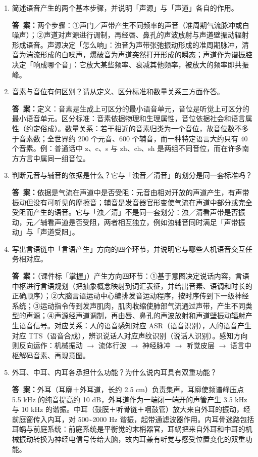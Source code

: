 \documentclass[10.5pt]{ctexart}
\newenvironment{qlist}
  {\begin{enumerate}[label={\sffamily\bfseries\color{accent}\arabic*.},leftmargin=2.4em,labelsep=0.55em,itemsep=0.62em,topsep=0.15em,parsep=0.3em,partopsep=0pt]}
  {\end{enumerate}}
\newcommand{\anslabel}{{\sffamily\bfseries\color{accent}答\ 案：}\hspace{0.35em}}
\newcommand{\ansL}[1]{\par\vspace{3.6\baselineskip}\begin{ansbox}\anslabel #1\end{ansbox}}
\begin{document}
\begin{qlist}

\item 简述语音产生的两个基本步骤，并说明「声源」与「声道」各自的作用。
\ansL{两个步骤：①声门／声带产生不同频率的声音（准周期气流脉冲或白噪声）；②声道对声源进行调制，再经唇、鼻孔的声波放射与声道壁振动辐射形成语音。声源决定「怎么响」：浊音为声带张弛振动形成的准周期脉冲，清音为湍流形成的白噪声，爆破音为声道突然打开形成的瞬态；声道作为谐振腔决定「响成哪个音」：它放大某些频率、衰减其他频率，被放大的频率即共振峰。}

\item 音素与音位有何区别？请从定义、区分标准和数量关系三方面作答。
\ansL{定义：音素是生成上可区分的最小语音单元，音位是听觉上可区分的最小语音单元。区分标准：音素依据物理和生理属性，音位依据社会和语言属性（约定俗成）。数量关系：若干相近的音素归类为一个音位，故音位数不多于音素数；全世界约 200 个元音、600 个辅音，而一种特定语言大约只有 40 个音素。例：普通话中 z、c、s 与 zh、ch、sh 是两组不同音位，而在许多南方方言中属同一组音位。}

\item 判断元音与辅音的依据是什么？它与「浊音／清音」的划分是同一套标准吗？
\ansL{依据是气流在声道中是否受阻：元音由相对开放的声道产生，有声带振动但没有可听见的摩擦音；辅音是发音器官形变使气流在声道中部分或完全受阻而产生的语音。它与「浊／清」不是同一套划分：浊／清看声带是否振动，元／辅看声道是否受阻，两者相互独立，例如浊辅音同时满足「声带振动」与「声道受阻」。}

\item 写出言语链中「言语产生」方向的四个环节，并说明它与哪些人机语音交互任务相对应。
\ansL{（课件标「掌握」）产生方向四环节：①基于意图决定说话内容，言语中枢进行言语规划（把抽象概念映射到词汇表征，并给出音素、语调和时长的正确顺序）；②大脑言语运动中心编排发音运动程序，按时序传到下一级神经系统；③运动指令传到发声肌肉，肌肉收缩使肺部气流通过声带，产生不同类型的声源；④声源经声道调制，再由唇、鼻孔的声波放射和声道壁振动辐射产生语音信号。对应关系：人的语音感知对应 ASR（语音识别），人的语音产生对应 TTS（语音合成），辨识说话人对应声纹识别（说话人识别）。感知方向则反向运作：机械振动 $\to$ 流体行波 $\to$ 神经脉冲 $\to$ 听觉皮层 $\to$ 语言中枢解码音素、再现意图。}

\item 外耳、中耳、内耳各承担什么功能？为什么说内耳具有双重功能？
\ansL{外耳（耳廓＋外耳道，长约 2.5 cm）负责集声，耳廓使频谱峰压点 5.5 kHz 的纯音提高约 10 dB，外耳道作为一端闭一端开的声管产生 3.5 kHz 与 10 kHz 的谐振。中耳（鼓膜＋听骨链＋咽鼓管）放大来自外耳的振动，经前庭窗传入内耳，对 500\textasciitilde 2000 Hz 谐振，起带通滤波器作用。内耳骨迷路包括耳蜗与前庭系统：前庭系统是平衡觉的末梢器官，耳蜗把来自外耳和中耳的机械振动转换为神经电信号传给大脑，故内耳兼有听觉与感受位置变化的双重功能。}

\end{qlist}
\end{document}
